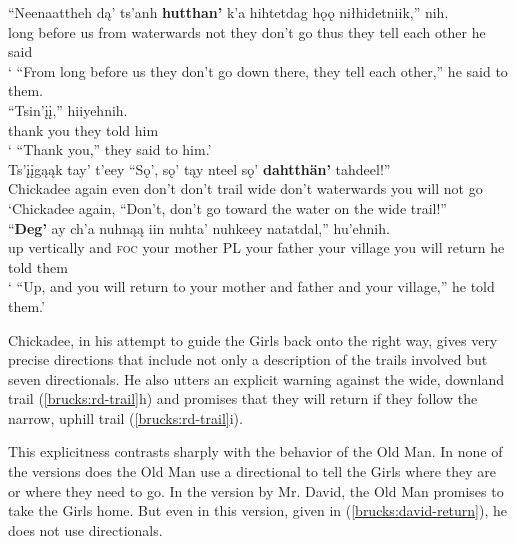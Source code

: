 \begin{exe}
\begin{xlist}
\ex \gll ``{Neenaattheh dą'} ts'anh \textbf{hutthan'} k'a hihtetdag hǫǫ niłhidetniik,'' nih.  \\
 {long before us} from waterwards not {they don't go} thus {they tell each other} {he said} \\
\glt ` ``From long before us they don't go down there, they tell each other,'' he said to them. \\

\ex \gll ``Tsin'įį,'' hiiyehnih.  \\
 {thank you} {they told him} \\
\glt ` ``Thank you,'' they said to him.' \\

\ex \gll Ts'įįgąąk tay' t'eey ``Sǫ', sǫ' tąy nteel sǫ' \textbf{dahtthän'} tahdeel!''  \\
 Chickadee again even don't don't trail wide don't waterwards {you will not go} \\
\glt `Chickadee again, ``Don't, don't go toward the water on the wide trail!'' \\

\ex \gll ``\textbf{Deg'} ay ch'a nuhnąą iin nuhta' nuhkeey natatdal,'' hu'ehnih.  \\
 {up vertically} and \textsc{foc} {your mother} PL {your father} {your village} {you will return} {he told them} \\
\glt ` ``Up, and you will return to your mother and father and your village,'' he told them.' \\
\end{xlist}
\end{exe}

Chickadee, in his attempt to guide the Girls back onto the right way, gives very precise directions that include not only a description of the trails involved but seven directionals. He also utters an explicit warning against the wide, downland trail (\ref{brucks:rd-trail}h) and promises that they will return if they follow the narrow, uphill trail (\ref{brucks:rd-trail}i).

This explicitness contrasts sharply with the behavior of the Old Man. In none of the versions does the Old Man use a directional to tell the Girls where they are or where they need to go. In the version by Mr. David, the Old Man promises to take the Girls home. But even in this version, given in (\ref{brucks:david-return}), he does not use directionals.

